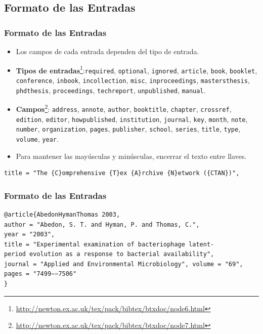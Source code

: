 \documentclass[aspectratio=43]{beamer}%
\begin{document}
\subsection{Formato de las Entradas}


\begin{frame}[fragile]
\frametitle{\textbf{Formato de las Entradas}}
\justifying
 \begin{itemize}\justifying
  \item Los campos de cada entrada dependen del tipo de entrada.
\pause  \item \textbf{Tipos de entradas}\footnote{\url{http://newton.ex.ac.uk/tex/pack/bibtex/btxdoc/node6.html}}:\texttt{required}, \texttt{optional}, \texttt{ignored}, \texttt{article}, \texttt{book}, \texttt{booklet}, \texttt{conference}, \texttt{inbook}, \texttt{incollection},  \texttt{misc}, \texttt{inproceedings},   \texttt{mastersthesis}, \texttt{phdthesis}, \texttt{proceedings}, \texttt{techreport}, \texttt{unpublished}, \texttt{manual}.
 \pause \item \textbf{Campos}\footnote{\url{http://newton.ex.ac.uk/tex/pack/bibtex/btxdoc/node7.html}}: \texttt{address}, \texttt{annote}, \texttt{author}, \texttt{booktitle}, \texttt{chapter}, \texttt{crossref}, \texttt{edition}, \texttt{editor}, \texttt{howpublished}, \texttt{institution}, \texttt{journal}, \texttt{key}, \texttt{month}, \texttt{note}, \texttt{number}, \texttt{organization}, \texttt{pages}, \texttt{publisher}, \texttt{school}, \texttt{series}, \texttt{title}, \texttt{type}, \texttt{volume}, \texttt{year}.
\pause  \item Para mantener las mayúsculas y minúsculas, encerrar el texto entre llaves.
\end{itemize}

\scriptsize
\begin{verbatim}
title = "The {C}omprehensive {T}ex {A}rchive {N}etwork ({CTAN})", 
\end{verbatim}
\end{frame}



\begin{frame}[fragile]
\frametitle{\textbf{Formato de las Entradas}}
\justifying
 \begin{exampleblock}{}
   \vspace{-0.7cm}
\begin{lstlisting}
@article{AbedonHymanThomas 2003,
author = "Abedon, S. T. and Hyman, P. and Thomas, C.",
year = "2003",
title = "Experimental examination of bacteriophage latent-
period evolution as a response to bacterial availability",
journal = "Applied and Environmental Microbiology", volume = "69",
pages = "7499−−7506"
}
\end{lstlisting}\vspace{-0.3cm}
\end{exampleblock}
\end{frame}
\end{document}
